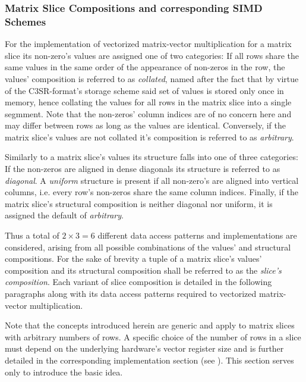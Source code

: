       \subsubsection{Matrix Slice Compositions and corresponding SIMD Schemes}

        For the implementation of vectorized matrix-vector multiplication for a matrix slice its non-zero's values are
        assigned one of two categories: If all rows share the same values in the same order of the appearance of
        non-zeros in the row, the values' composition is referred to as \emph{collated}, named after the fact that by
        virtue of the C3SR-format's storage scheme said set of values is stored only once in memory, hence collating the
        values for all rows in the matrix slice into a single segmment. Note that the non-zeros' column indices are of
        no concern here and may differ between rows as long as the values are identical. Conversely, if the matrix
        slice's values are not collated it's composition is referred to as \emph{arbitrary}.

        Similarly to a matrix slice's values its structure falls into one of three categories: If the non-zeros are
        aligned in dense diagonals its structure is referred to as \emph{diagonal}. A \emph{uniform} structure is
        present if all non-zero's are aligned into vertical columns, i.e. every row's non-zeros share the same column
        indices. Finally, if the matrix slice's structural composition is neither diagonal nor uniform, it is assigned
        the default of \emph{arbitrary}.

        Thus a total of $2 \times 3 = 6$ different data access patterns and implementations are considered, arising from
        all possible combinations of the values' and structural compositions. For the sake of brevity a tuple of a
        matrix slice's values' composition and its structural composition shall be referred to as the \emph{slice's
        composition}. Each variant of slice composition is detailed in the following paragraphs along with its data
        access patterns required to vectorized matrix-vector multiplication.

        Note that the concepts introduced herein are generic and apply to matrix slices with arbitrary numbers of rows.
        A specific choice of the number of rows in a slice must depend on the underlying hardware's vector register size
        and is further detailed in the corresponding implementation section (see ). This
        section serves only to introduce the basic idea.


